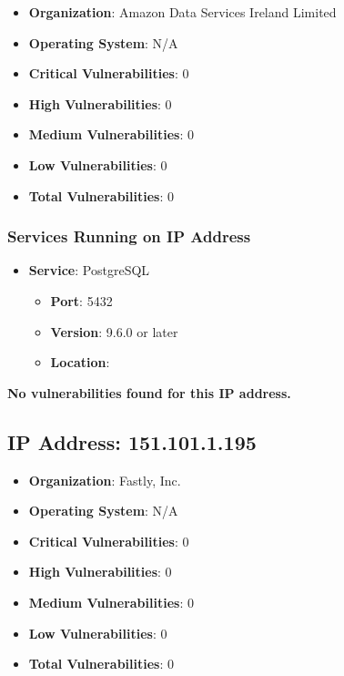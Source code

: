 \documentclass{article}
\begin{document}
\begin{itemize}
    \item \textbf{Organization}: Amazon Data Services Ireland Limited
    \item \textbf{Operating System}:  N/A 
    \item \textbf{Critical Vulnerabilities}: 0
    \item \textbf{High Vulnerabilities}: 0
    \item \textbf{Medium Vulnerabilities}: 0
    \item \textbf{Low Vulnerabilities}: 0
    \item \textbf{Total Vulnerabilities}: 0
\end{itemize}

\subsubsection*{Services Running on IP Address}

\begin{itemize}
    
        \item \textbf{Service}: PostgreSQL
        \begin{itemize}
            \item \textbf{Port}: 5432
            \item \textbf{Version}:  9.6.0 or later 
            \item \textbf{Location}: \href{  }{  }
        \end{itemize}
    
\end{itemize}


\textbf{No vulnerabilities found for this IP address.}




\clearpage



\subsection{IP Address: 151.101.1.195}

\begin{itemize}
    \item \textbf{Organization}: Fastly, Inc.
    \item \textbf{Operating System}:  N/A 
    \item \textbf{Critical Vulnerabilities}: 0
    \item \textbf{High Vulnerabilities}: 0
    \item \textbf{Medium Vulnerabilities}: 0
    \item \textbf{Low Vulnerabilities}: 0
    \item \textbf{Total Vulnerabilities}: 0
\end{itemize}
\end{document}
